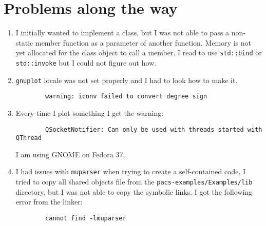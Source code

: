 \documentclass[]{article}
\begin{document}
\section{Problems along the way}

\begin{enumerate}
	\item I initially wanted to implement a class, but I was not able to pass a non-static member function as a parameter of another function.
	Memory is not yet allocated for the class object to call a member. I read to use \texttt{std::bind} or \texttt{std::invoke} but I could not figure out how.
	\item \texttt{gnuplot} locale was not set properly and I had to look how to make it.
	\begin{verbatim}
		warning: iconv failed to convert degree sign
	\end{verbatim}
	\item  Every time I plot something I get the warning:
	{
	\small
	\begin{verbatim}
		QSocketNotifier: Can only be used with threads started with QThread
	\end{verbatim}
	}
	I am using GNOME on Fedora 37.
	\item I had issues with \texttt{muparser} when trying to create a self-contained code.
	I tried to copy all shared objects file from the \texttt{pacs-examples/Examples/lib} directory, but I was not able to copy the symbolic links.
	I got the following error from the linker:
	\begin{verbatim}
		cannot find -lmuparser
	\end{verbatim}
\end{enumerate}
\end{document}
